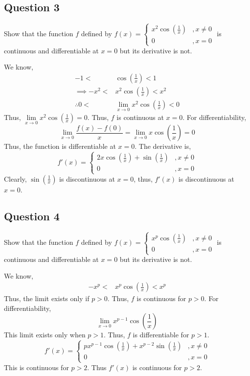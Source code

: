 \subsection{Question 3}
\begin{asign}
	Show that the function $f$ defined by  $f(x)=\begin{cases}
		x^2\cos(\frac{1}{x}) &, x\neq0\\
		0 &, x=0
	\end{cases}$ is continuous and differentiable at $x=0$ but its derivative is not.
\end{asign}

\begin{anse}
	We know,
	\[\begin{split}
		-1< &\cos(\frac{1}{x})< 1\\
		\implies -x^2 < & x^2\cos(\frac{1}{x})<x^2\\
		\therefore 0<& \lim\limits_{x\to 0}x^2\cos(\frac{1}{x})<0
	\end{split}\]
	Thus, $\lim\limits_{x\to0}x^2\cos(\frac{1}{x})=0$. Thus, $f$ is continuous at $x=0$. For differentiability,
	\[\lim\limits_{x\to0}\frac{f(x)-f(0)}{x}=\lim\limits_{x\to0}x\cos(\frac{1}{x})=0\]
	Thus, the function is differentiable at $x=0$. The derivative is,
	\[f'(x)=\begin{cases}
		2x\cos(\frac{1}{x})+\sin(\frac{1}{x}) &, x\neq0\\
		0 &, x=0
	\end{cases}\]
	Clearly, $\sin(\frac{1}{x})$ is discontinuous at $x=0$, thus, $f'(x)$ is discontinuous at $x=0$.
\end{anse}
\subsection{Question 4}
\begin{asign}
	Show that the function $f$ defined by  $f(x)=\begin{cases}
		x^p\cos(\frac{1}{x}) &, x\neq0\\
		0 &, x=0
	\end{cases}$ is continuous and differentiable at $x=0$ but its derivative is not.
\end{asign}
\begin{anse}
	We know,
	\[\begin{split}
		-x^p<&x^p\cos(\frac{1}{x}) < x^p
	\end{split}\]
	Thus, the limit exists only if $p>0$. Thus, $f$ is continuous for $p>0$.  For differentiability,
	\[\lim\limits_{x\to0} x^{p-1}\cos(\frac{1}{x})\]
	This limit exists only when $p>1$. Thus, $f$ is differentiable for $p>1$.
	\[f'(x)=\begin{cases}
		px^{p-1}\cos(\frac{1}{x})+x^{p-2}\sin(\frac{1}{x}) &, x\neq0\\
		0 &, x=0
	\end{cases}\]
	This is continuous for $p>2$. Thus $f'(x)$ is continuous for $p>2$.
\end{anse}
